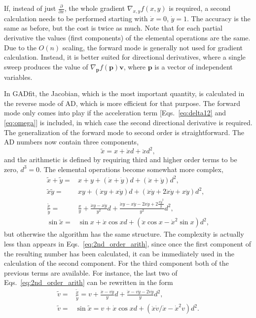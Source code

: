 \documentclass{article}
\begin{document}
If, instead of just $\frac{\partial}{\partial x}$, the whole gradient $\nabla_{x,y}f(x,y)$ is required, a second calculation needs to be performed starting with $\dot x = 0$, $\dot y = 1$. The accuracy is the same as before, but the cost is twice as much. Note that for each partial derivative the values (first components) of the elemental operations are the same. Due to the $O(n)$ scaling, the forward mode is generally not used for gradient calculation. Instead, it is better suited for directional derivatives, where a single sweep produces the value of $\nabla_{\bm p}f(\bm p)\bm v$, where $\bm p$ is a vector of independent variables.

In GADfit, the Jacobian, which is the most important quantity, is calculated in the reverse mode of AD, which is more efficient for that purpose. The forward mode only comes into play if the acceleration term [Eqs.~\eqref{eq:delta12} and \eqref{eq:omega}] is included, in which case the second directional derivative is required. The generalization of the forward mode to second order is straightforward. The AD numbers now contain three components,
\begin{equation}
  \label{eq:adcomplex}
  \tilde x = x + \dot x d + \ddot x d^2,
\end{equation}
and the arithmetic is defined by requiring third and higher order terms to be zero, $d^3 = 0$. The elemental operations become somewhat more complex,
\begin{equation}
  \label{eq:2nd_order_arith}
  \begin{split}
    \tilde x + \tilde y =& x + y + (\dot x + \dot y)d + (\ddot x +
    \ddot y)d^2, \\
    \tilde x\tilde y =& xy + (\dot xy + x\dot y)d +
    (\ddot x\dot y + 2\dot x\dot y + x\ddot y)d^2, \\
    \frac{\tilde x}{\tilde y} =& \frac{x}{y} + \frac{\dot xy-x\dot
      y}{y^2}d + \frac{\ddot xy-x\ddot y-2\dot x\dot y+2\frac{x\dot
        y^2}{y}}{y^2}d^2, \\
    \sin\tilde x =& \sin x + \dot x\cos x d + (\ddot x\cos x - \dot
    x^2\sin x) d^2,
  \end{split}
\end{equation}
but otherwise the algorithm has the same structure. The complexity is actually less than appears in Eqs.~\eqref{eq:2nd_order_arith}, since once the first component of the resulting number has been calculated, it can be immediately used in the calculation of the second component. For the third component both of the previous terms are available. For instance, the last two of Eqs.~\eqref{eq:2nd_order_arith} can be rewritten in the form
\begin{equation}
  \label{eq:2nd_order_arith_compact}
  \begin{split}
    \tilde v =& \frac{\tilde x}{\tilde y} = v + \frac{\dot x-v\dot
      y}{y}d + \frac{\ddot x-v\ddot y-2\dot v\dot y}{y}d^2, \\
    \tilde v =& \sin\tilde x = v + \dot x\cos x d + (\ddot x\dot
    v/\dot x - \dot x^2v) d^2.
  \end{split}
\end{equation}
\end{document}

